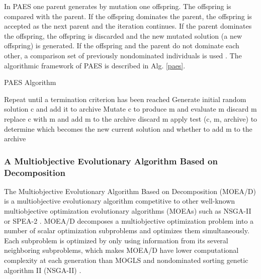 \documentclass[espaco=umemeio,chapter=TITLE,twoside,openright]{abnt}
\begin{document}
In PAES one parent generates by mutation one
offspring. The offspring is compared with the parent. If the offspring dominates the parent, the offspring is accepted as
the next parent and the iteration continues. If the parent dominates the offspring, the offspring is discarded and the new mutated solution (a new offspring) is generated. If the offspring and the parent do not dominate each other, a comparison set of previously nondominated individuals is used \cite{Knowles1999}\cite{Oltean2005}. The algorithmic framework of PAES is described in Alg. \ref{paes}.


\begin{algorithm}[h]
  \caption{PAES Algorithm \cite{Knowles1999}\cite{Oltean2005}}\label{paes}
  \begin{algorithmic}[1]
    \State Repeat until a termination criterion has been reached
    \State Generate initial random solution c and add it to archive
    \State Mutate c to produce m and evaluate m
    \State discard m
    \Else
     \State replace c with m and add m to the archive
    \Else
    \State discard m
    \Else
    \State apply test (c, m, archive) to determine which becomes the new current solution and whether to add m to the archive
    \EndIf
    \EndIf
    \EndIf
  \end{algorithmic}
\end{algorithm}

\subsubsection{A Multiobjective Evolutionary Algorithm Based on Decomposition}

The Multiobjective Evolutionary Algorithm Based on Decomposition (MOEA/D) is a multiobjective evolutionary algorithm competitive to other well-known multiobjective optimization evolutionary algorithms (MOEAs) such as NSGA-II or SPEA-2 \cite{Michalak2014}. MOEA/D decomposes a multiobjective optimization problem into a number of scalar optimization subproblems and optimizes them simultaneously. Each subproblem is optimized by only using information from its several neighboring subproblems, which makes MOEA/D have lower computational complexity at each generation than MOGLS and nondominated sorting genetic
algorithm II (NSGA-II) \cite{Zhang2007}. 
\end{document}
